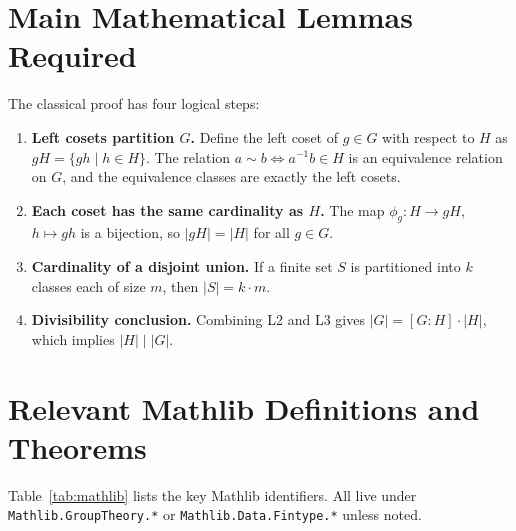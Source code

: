 \documentclass[11pt, a4paper]{article}
\theoremstyle{plain}
\theoremstyle{definition}
\newcommand{\abs}[1]{\lvert #1 \rvert}
\newcommand{\divides}{\mid}
\begin{document}
\section{Main Mathematical Lemmas Required}
\label{sec:math-lemmas}

The classical proof has four logical steps:

\begin{enumerate}[label=\textbf{L\arabic*.}, leftmargin=*, widest=L4]

  \item \textbf{Left cosets partition $G$.}
    Define the left coset of $g \in G$ with respect to $H$ as
    $gH = \{gh \mid h \in H\}$.
    The relation $a \sim b \iff a^{-1}b \in H$ is an equivalence relation on
    $G$, and the equivalence classes are exactly the left cosets.

  \item \textbf{Each coset has the same cardinality as $H$.}
    The map $\phi_g \colon H \to gH$, $h \mapsto gh$ is a bijection, so
    $\abs{gH} = \abs{H}$ for all $g \in G$.

  \item \textbf{Cardinality of a disjoint union.}
    If a finite set $S$ is partitioned into $k$ classes each of size $m$,
    then $\abs{S} = k \cdot m$.

  \item \textbf{Divisibility conclusion.}
    Combining L2 and L3 gives $\abs{G} = [G:H] \cdot \abs{H}$, which implies
    $\abs{H} \divides \abs{G}$.

\end{enumerate}

\section{Relevant Mathlib Definitions and Theorems}
\label{sec:mathlib}

Table~\ref{tab:mathlib} lists the key Mathlib identifiers. All live under
\texttt{Mathlib.GroupTheory.*} or \texttt{Mathlib.Data.Fintype.*} unless
noted.
\end{document}
